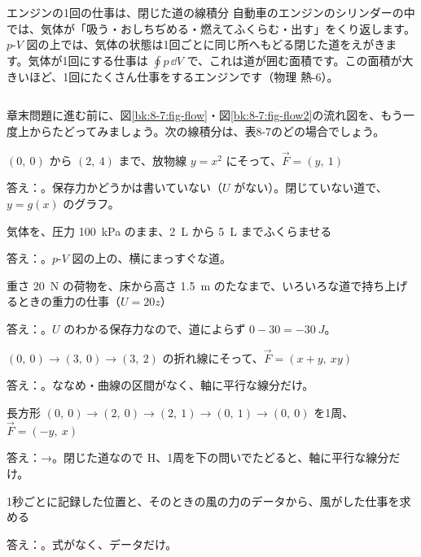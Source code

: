 \begin{column}{エンジンの1回の仕事は、閉じた道の線積分}
自動車のエンジンのシリンダーの中では、気体が「吸う・おしちぢめる・燃えてふくらむ・出す」をくり返します。$p$-$V$ 図の上では、気体の状態は1回ごとに同じ所へもどる閉じた道をえがきます。気体が1回にする仕事は $\oint p\,\dd V$ で、これは道が囲む面積です。この面積が大きいほど、1回にたくさん仕事をするエンジンです（物理 熱-6）。
\end{column}

章末問題に進む前に、図\ref{bk:8-7:fig-flow}・図\ref{bk:8-7:fig-flow2}の流れ図を、もう一度上からたどってみましょう。次の線積分は、表8-7のどの場合でしょう。
\begin{enumerate}[label={\bkcircled[\bkTT]{\arabic*}}, leftmargin=2.4\zw, itemsep=3pt, topsep=2pt]
\item $(0,\ 0)$ から $(2,\ 4)$ まで、放物線 $y=x^2$ にそって、$\vec F=(y,\ 1)$\par\nobreak\noindent 答え：。保存力かどうかは書いていない（$U$ がない）。閉じていない道で、$y=g(x)$ のグラフ。
\item 気体を、圧力 \qty{100}{kPa} のまま、\qty{2}{L} から \qty{5}{L} までふくらませる\par\nobreak\noindent 答え：。$p$-$V$ 図の上の、横にまっすぐな道。
\item 重さ \qty{20}{N} の荷物を、床から高さ \qty{1.5}{m} のたなまで、いろいろな道で持ち上げるときの重力の仕事（$U=20z$）\par\nobreak\noindent 答え：。$U$ のわかる保存力なので、道によらず $0-30=\qty{-30}{J}$。
\item $(0,\ 0)\to(3,\ 0)\to(3,\ 2)$ の折れ線にそって、$\vec F=(x+y,\ xy)$\par\nobreak\noindent 答え：。ななめ・曲線の区間がなく、軸に平行な線分だけ。
\item 長方形 $(0,\ 0)\to(2,\ 0)\to(2,\ 1)\to(0,\ 1)\to(0,\ 0)$ を1周、$\vec F=(-y,\ x)$\par\nobreak\noindent 答え：→。閉じた道なので H、1周を下の問いでたどると、軸に平行な線分だけ。
\item 1秒ごとに記録した位置と、そのときの風の力のデータから、風がした仕事を求める\par\nobreak\noindent 答え：。式がなく、データだけ。
\end{enumerate}

\bkendproblems
{}

